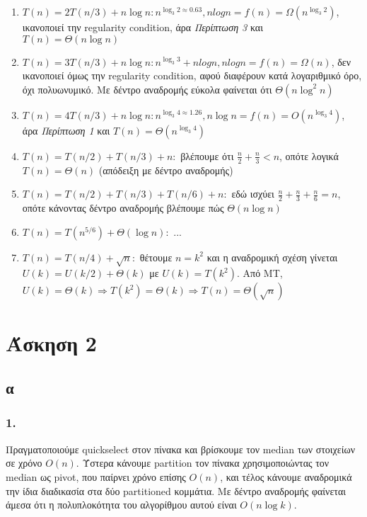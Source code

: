 \documentclass[12pt,a4paper]{article}
\begin{document}
    \begin{enumerate}
      \item \( T(n) = 2T(n/3) + n\log{n} : n^{\log_{3}2 \approx 0.63 }, 
      nlogn = f(n) = \Omega(n^{\log_{3}2}) \), ικανοποιεί την {\latintext 
      regularity condition}, άρα \textit{Περίπτωση 3} και \( T(n)=\Theta(n\log{n}) \)
      \item \( T(n) = 3T(n/3) + n\log{n} : n^{\log_{3}3} + nlogn, nlogn = 
      f(n) = \Omega(n) \), δεν ικανοποιεί όμως την {\latintext regularity 
      condition}, αφού διαφέρουν κατά λογαριθμικό όρο, όχι πολυωνυμικό. Με δέντρο αναδρομής εύκολα φαίνεται ότι \( \Theta(n\log^{2}{n}) \)
      \item \( T(n) = 4T(n/3) + n\log{n} : n^{\log_{3}{4} \approx 1.26}, n\log{n} =
      f(n) = O(n^{\log_{3}4}) \), άρα \textit{Περίπτωση 1} και \( Τ(n) = \Theta(n^{\log_{3}{4}}) \)
      \item \( T(n) = T(n/2) + T(n/3) + n : \) βλέπουμε ότι \( \frac{n}{2} + 
      \frac{n}{3} < n \), οπότε λογικά \( T(n) = \Theta(n) \) (απόδειξη με δέντρο αναδρομής)
      \item \( Τ(n) = T(n/2) + T(n/3) + T(n/6) + n : \) εδώ ισχύει \( \frac{n}{2} 
      + \frac{n}{3} + \frac{n}{6} = n \), οπότε κάνοντας δέντρο αναδρομής βλέπουμε
      πώς \( \Theta(n\log{n}) \) 
      \item \( T(n) = T(n^{5/6}) + \Theta(\log{n}) : \) ...
      \item \( T(n) = T(n/4) + \sqrt{n} : \) θέτουμε \(n=k^2\) και η αναδρομική 
      σχέση γίνεται \( U(k) = U(k/2) + \Theta(k) \) με \( U(k)=T(k^2) \). Από 
      {\latintext MT}, \( U(k)=\Theta(k) \Rightarrow T(k^2)=\Theta(k) \Rightarrow 
      T(n)=\Theta(\sqrt{n}) \)
    \end{enumerate}

  \section{Άσκηση 2}

  \subsection{α}

  \subsubsection{1.}
    Πραγματοποιούμε {\latintext quickselect} στον πίνακα και βρίσκουμε τον
     {\latintext median} των στοιχείων σε χρόνο \( Ο(n) \).
    Ύστερα κάνουμε {\latintext partition} τον πίνακα χρησιμοποιώντας τον
     {\latintext median} ως {\latintext pivot}, που παίρνει χρόνο επίσης \( Ο(n) \), και τέλος κάνουμε αναδρομικά την ίδια διαδικασία στα δύο {\latintext partitioned} κομμάτια.
    Με δέντρο αναδρομής φαίνεται άμεσα ότι η πολυπλοκότητα του αλγορίθμου
     αυτού είναι \( Ο(n\log{k}) \).
\end{document}
